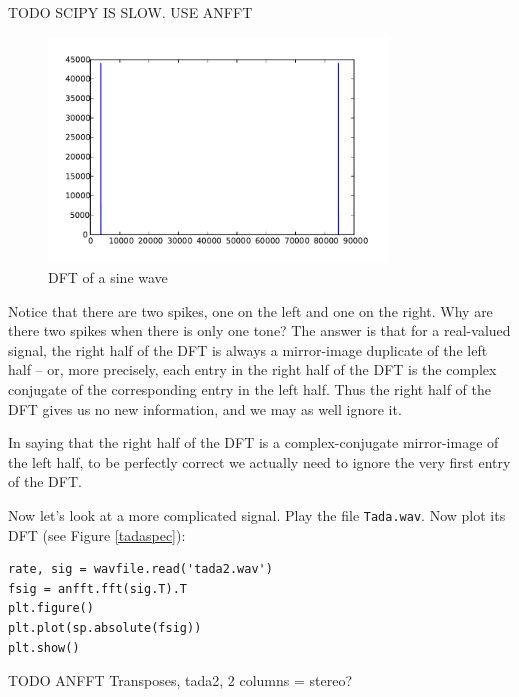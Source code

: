 TODO SCIPY IS SLOW.  USE ANFFT

\begin{figure}[ht]\caption{DFT of a sine wave}\label{sinespec}\centering\includegraphics[width=90mm]{sinespec}\end{figure}
Notice that there are two spikes, one on the left and one on the right. Why are there two spikes when there is only one tone? The answer is that for a real-valued signal, the right half of the DFT is always a mirror-image duplicate of the left half -- or, more precisely, each entry in the right half of the DFT is the complex conjugate of the corresponding entry in the left half. Thus the right half of the DFT gives us no new information, and we may as well ignore it.

In saying that the right half of the DFT is a complex-conjugate mirror-image of the left half, to be perfectly correct we actually need to ignore the very first entry of the DFT.

Now let's look at a more complicated signal. Play the file \texttt{Tada.wav}.
Now plot its DFT (see Figure \ref{tadaspec}):
\begin{lstlisting}
rate, sig = wavfile.read('tada2.wav')
fsig = anfft.fft(sig.T).T
plt.figure()
plt.plot(sp.absolute(fsig))
plt.show()
\end{lstlisting}
TODO ANFFT Transposes, tada2, 2 columns = stereo?

